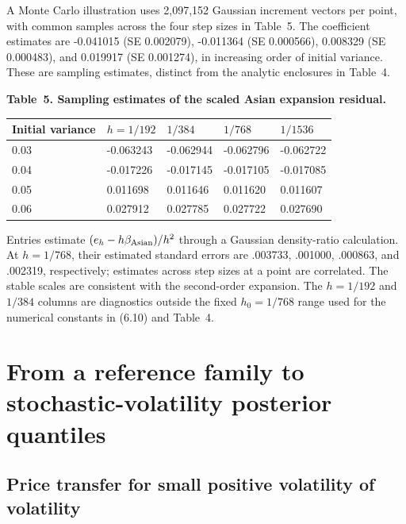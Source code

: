 \documentclass[11pt,a4paper]{article}
\begin{document}
A Monte Carlo illustration uses 2,097,152 Gaussian increment vectors per point,
with common samples across the four step sizes in Table~5. The coefficient
estimates are -0.041015 (SE 0.002079), -0.011364 (SE 0.000566),
0.008329 (SE 0.000483), and 0.019917 (SE 0.001274), in increasing order of
initial variance. These are sampling estimates, distinct from the analytic
enclosures in Table~4.

\noindent\textbf{Table~5. Sampling estimates of the scaled Asian expansion residual.}
\begin{center}
\begin{tabularx}{\textwidth}{@{}l X X X X@{}}
\toprule
Initial variance & \(h=1/192\) & \(1/384\) & \(1/768\) & \(1/1536\) \\
\midrule
0.03 & -0.063243 & -0.062944 & -0.062796 & -0.062722 \\
0.04 & -0.017226 & -0.017145 & -0.017105 & -0.017085 \\
0.05 & 0.011698 & 0.011646 & 0.011620 & 0.011607 \\
0.06 & 0.027912 & 0.027785 & 0.027722 & 0.027690 \\
\bottomrule
\end{tabularx}
\end{center}

Entries estimate \((e_h-h\beta_{\rm Asian})/h^2\) through a Gaussian
density-ratio calculation. At \(h=1/768\), their estimated standard errors
are .003733, .001000, .000863, and .002319, respectively; estimates across
step sizes at a point are correlated. The stable scales are consistent with
the second-order expansion. The \(h=1/192\) and \(1/384\) columns are
diagnostics outside the fixed \(h_0=1/768\) range used for the numerical
constants in (6.10) and Table~4.


\section{From a reference family to stochastic-volatility posterior quantiles}

\subsection{Price transfer for small positive volatility of volatility}
\end{document}
